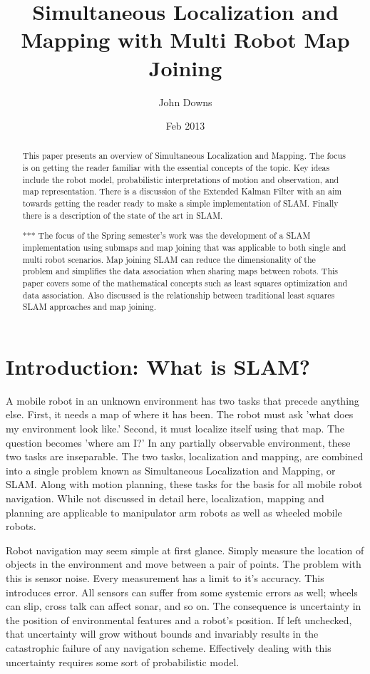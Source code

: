 \documentclass[12pt]{report}
\title{Simultaneous Localization and Mapping with Multi Robot Map Joining}
\author{John Downs}
\date{Feb 2013}
\begin{document}
\maketitle


\begin{abstract}
This paper presents an overview of Simultaneous Localization and Mapping.  The focus is on getting the reader familiar with the essential concepts of the topic.  Key ideas include the robot model, probabilistic interpretations of motion and observation, and map representation.  There is a discussion of the Extended Kalman Filter with an aim towards getting the reader ready to make a simple implementation of SLAM.  Finally there is a description of the state of the art in SLAM.

***
The focus of the Spring semester's work was the development of a SLAM implementation using submaps and map joining that was applicable to both single and multi robot scenarios.  Map joining SLAM can reduce the dimensionality of the problem and simplifies the data association when sharing maps between robots.  This paper covers some of the mathematical concepts such as least squares optimization and data association.  Also discussed is the relationship between traditional least squares SLAM approaches and map joining.
\end{abstract}
 
\chapter{Introduction: What is SLAM?}

A mobile robot in an unknown environment has two tasks that precede anything else.  First, it needs a map of where it has been.  The robot must ask 'what does my environment look like.'  Second, it must localize itself using that map.  The question becomes 'where am I?'  In any partially observable environment, these two tasks are inseparable.  The two tasks, localization and mapping, are combined into a single problem known as Simultaneous Localization and Mapping, or SLAM.  Along with motion planning, these tasks for the basis for all mobile robot navigation.  While not discussed in detail here, localization, mapping and planning are applicable to manipulator arm robots as well as wheeled mobile robots.

Robot navigation may seem simple at first glance.  Simply measure the location of objects in the environment and move between a pair of points.  The problem with this is sensor noise.  Every measurement has a limit to it's accuracy.  This introduces error.  All sensors can suffer from some systemic errors as well; wheels can slip, cross talk can affect sonar, and so on.  The consequence is uncertainty in the position of environmental features and a robot's position.  If left unchecked, that uncertainty will grow without bounds and invariably results in the catastrophic failure of any navigation scheme.  Effectively dealing with this uncertainty requires some sort of probabilistic model.
\end{document}
